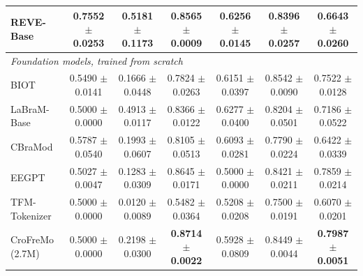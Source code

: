 \begin{table}[t]
{\begin{tabular}{lcccccc}
REVE-Base & \textbf{0.7552 $\pm$ 0.0253} & \textbf{0.5181 $\pm$ 0.1173} & 0.8565 $\pm$ 0.0009 & 0.6256 $\pm$ 0.0145 & 0.8396 $\pm$ 0.0257 & 0.6643 $\pm$ 0.0260 \\
\midrule
\multicolumn{7}{l}{\textit{Foundation models, trained from scratch}} \\
BIOT & 0.5490 $\pm$ 0.0141 & 0.1666 $\pm$ 0.0448 & 0.7824 $\pm$ 0.0263 & 0.6151 $\pm$ 0.0397 & 0.8542 $\pm$ 0.0090 & 0.7522 $\pm$ 0.0128 \\
LaBraM-Base & 0.5000 $\pm$ 0.0000 & 0.4913 $\pm$ 0.0117 & 0.8366 $\pm$ 0.0122 & 0.6277 $\pm$ 0.0400 & 0.8204 $\pm$ 0.0501 & 0.7186 $\pm$ 0.0522 \\
CBraMod & 0.5787 $\pm$ 0.0540 & 0.1993 $\pm$ 0.0607 & 0.8105 $\pm$ 0.0513 & 0.6093 $\pm$ 0.0281 & 0.7790 $\pm$ 0.0224 & 0.6422 $\pm$ 0.0339 \\
EEGPT & 0.5027 $\pm$ 0.0047 & 0.1283 $\pm$ 0.0309 & 0.8645 $\pm$ 0.0171 & 0.5000 $\pm$ 0.0000 & 0.8421 $\pm$ 0.0211 & 0.7859 $\pm$ 0.0214 \\
TFM-Tokenizer & 0.5000 $\pm$ 0.0000 & 0.0120 $\pm$ 0.0089 & 0.5482 $\pm$ 0.0364 & 0.5208 $\pm$ 0.0208 & 0.7500 $\pm$ 0.0191 & 0.6070 $\pm$ 0.0201 \\
\midrule
CroFreMo (2.7M) & 0.5000 $\pm$ 0.0000 & 0.2198 $\pm$ 0.0300 & \textbf{0.8714 $\pm$ 0.0022} & 0.5928 $\pm$ 0.0809 & 0.8449 $\pm$ 0.0044 & \textbf{0.7987 $\pm$ 0.0051} \\
\bottomrule
\end{tabular}}
\end{table}

